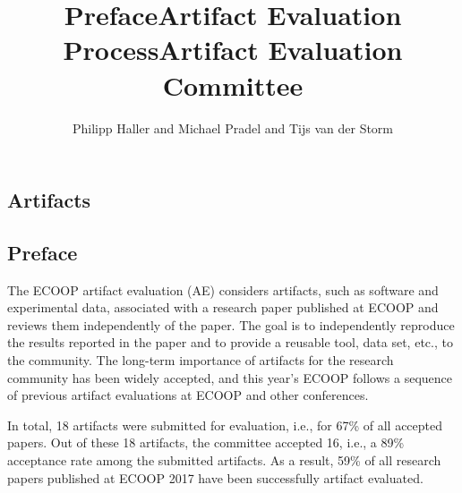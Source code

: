 \documentclass[a4paper,UKenglish]{dartsmaster}
\begin{document}
\begin{contentslist}

\contitem
\title{Preface}
\author{Philipp Haller and Michael Pradel and Tijs van der Storm}

\contitem
\title{Artifact Evaluation Process}
\author{ }

\contitem
\title{Artifact Evaluation Committee}
\author{ }

\part{Artifacts}



\end{contentslist}

\chapter{Preface} %

The ECOOP artifact evaluation (AE) considers artifacts, such as software and
experimental data, associated with a research paper published at ECOOP and
reviews them independently of the paper. The goal is to independently
reproduce the results reported in the paper and to provide a reusable tool,
data set, etc., to the community. The long-term importance of artifacts for
the research community has been widely accepted, and this year's ECOOP
follows a sequence of previous artifact evaluations at ECOOP and other
conferences.

In total, 18 artifacts were submitted for evaluation, i.e., for 67\% of all
accepted papers. Out of these 18 artifacts, the committee accepted 16, i.e.,
a 89\% acceptance rate among the submitted artifacts. As a result, 59\% of
all research papers published at ECOOP 2017 have been successfully artifact
evaluated.
\end{document}
